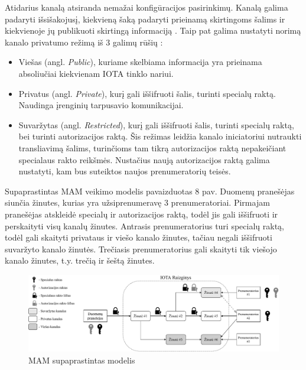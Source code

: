 Atidarius kanalą atsiranda nemažai konfigūracijos pasirinkimų. Kanalą galima padaryti išsišakojusį, kiekvieną šaką padaryti prieinamą skirtingoms šalims ir kiekvienoje jų publikuoti skirtingą informaciją \cite{ab2018iota}. Taip pat galima nustatyti norimą kanalo privatumo režimą iš 3 galimų rūšių \cite{paul2017introducing}:
\begin{itemize}
    \item Viešas (angl. \textit{Public}), kuriame skelbiama informacija yra prieinama absoliučiai kiekvienam IOTA tinklo nariui.
    \item Privatus (angl. \textit{Private}), kurį gali iššifruoti šalis, turinti specialų raktą. Naudinga įrenginių tarpusavio komunikacijai.
    \item Suvaržytas (angl. \textit{Restricted}), kurį gali iššifruoti šalis, turinti specialų raktą, bei turinti autorizacijos raktą. Šis režimas leidžia kanalo iniciatoriui nutraukti transliavimą šalims, turinčioms tam tikrą autorizacijos raktą nepakeičiant specialaus rakto reikšmės. Nustačius naują autorizacijos raktą galima nustatyti, kam bus suteiktos naujos prenumeratorių teisės.
\end{itemize}

Supaprastintas MAM veikimo modelis pavaizduotas 8 pav. Duomenų pranešėjas siunčia žinutes, kurias yra užsiprenumeravę 3 prenumeratoriai. Pirmajam pranešėjas atskleidė specialų ir autorizacijos raktą, todėl jis gali iššifruoti ir perskaityti visų kanalų žinutes. Antrasis prenumeratorius turi specialų raktą, todėl gali skaityti privataus ir viešo kanalo žinutes, tačiau negali iššifruoti suvaržyto kanalo žinutės. Trečiasis prenumeratorius gali skaityti tik viešojo kanalo žinutes, t.y. trečią ir šeštą žinutes.

\begin{figure}[H]
    \centering
    \includegraphics[scale=0.51]{images/mam-example}
    \caption{MAM supaprastintas modelis}
\end{figure}




